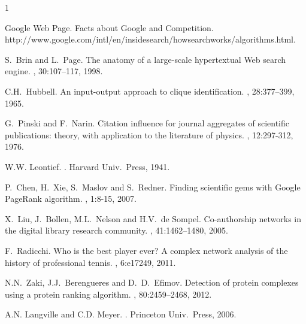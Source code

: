 \documentclass[11pt,draftcls,onecolumn]{IEEEtran}
\begin{document}
\newpage

\begin{thebibliography}{1}

Google Web Page. 
\newblock Facts about Google and Competition.
\newblock http://www.google.com/intl/en/insidesearch/howsearchworks/algorithms.html.



S.~Brin and L.~Page.
\newblock The anatomy of a large-scale hypertextual {Web} search engine.
, 30:107--117, 1998.


C.{\;}H.\ Hubbell.
\newblock An input-output approach to clique identification.
, 28:377--399, 1965.

G.~Pinski and F.~Narin.
\newblock Citation influence for journal aggregates of scientific
publications: theory, with application to the literature of physics.
, 12:297-312, 1976.

W.{\;}W. Leontief.
.
\newblock Harvard Univ.\ Press, 1941.

P.~Chen, H.~Xie, S.~Maslov and S.~Redner. 
\newblock Finding scientific gems with Google PageRank algorithm.
, 1:8-15, 2007.

X.~Liu, J.~Bollen, M.\;L.~Nelson and H.\;V.~de Sompel.
\newblock Co-authorship
networks in the digital library research community. 
, 41:1462--1480, 2005.

F.~Radicchi.
\newblock Who is the best player ever? A complex network analysis of the history of professional tennis.
, 6:e17249, 2011.

N.{\;}N.~Zaki, J.{\;}J.~Berengueres and D.~{\;}D.~Efimov.
\newblock Detection of protein complexes using a protein ranking algorithm.
, 80:2459--2468, 2012.

A.{\;}N. Langville and C.{\;}D. Meyer.
.
\newblock Princeton Univ.\ Press, 2006.



\end{thebibliography}
\end{document}
